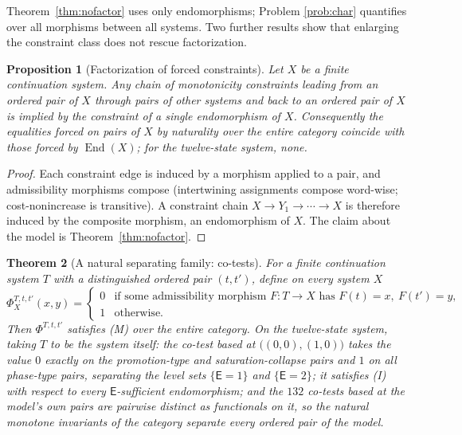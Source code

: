 \documentclass[11pt]{article}
\newtheorem{theorem}{Theorem}[section]
\newtheorem{proposition}[theorem]{Proposition}
\theoremstyle{remark}
\newcommand{\E}{\mathsf{E}}
\begin{document}
Theorem~\ref{thm:nofactor} uses only endomorphisms; Problem
\ref{prob:char} quantifies over all morphisms between all systems. Two
further results show that enlarging the constraint class does not
rescue factorization.

\begin{proposition}[Factorization of forced constraints]
\label{prop:factor}
Let $X$ be a finite continuation system. Any chain of monotonicity
constraints leading from an ordered pair of $X$ through pairs of other
systems and back to an ordered pair of $X$ is implied by the
constraint of a single endomorphism of $X$. Consequently the
equalities forced on pairs of $X$ by naturality over the entire
category coincide with those forced by $\operatorname{End}(X)$; for
the twelve-state system, none.
\end{proposition}

\begin{proof}
Each constraint edge is induced by a morphism applied to a pair, and
admissibility morphisms compose (intertwining assignments compose
word-wise; cost-nonincrease is transitive). A constraint chain
$X \to Y_1 \to \cdots \to X$ is therefore induced by the composite
morphism, an endomorphism of $X$. The claim about the model is
Theorem~\ref{thm:nofactor}.
\end{proof}

\begin{theorem}[A natural separating family: co-tests]
\label{thm:cotest}
For a finite continuation system $T$ with a distinguished ordered pair
$(t,t')$, define on every system $X$
\[
\Phi^{T,t,t'}_{X}(x,y) =
\begin{cases}
0 & \text{if some admissibility morphism } F\colon T\to X
\text{ has } F(t)=x,\ F(t')=y,\\
1 & \text{otherwise.}
\end{cases}
\]
Then $\Phi^{T,t,t'}$ satisfies (M) over the entire category. On the
twelve-state system, taking $T$ to be the system itself: the co-test
based at $\bigl((0,0),(1,0)\bigr)$ takes the value $0$ exactly on the
promotion-type and saturation-collapse pairs and $1$ on all
phase-type pairs, separating the level sets $\{\E=1\}$ and
$\{\E=2\}$; it satisfies (I) with respect to every $\E$-sufficient
endomorphism; and the $132$ co-tests based at the model's own pairs
are pairwise distinct as functionals on it, so the natural monotone
invariants of the category separate \emph{every} ordered pair of the
model.
\end{theorem}
\end{document}

